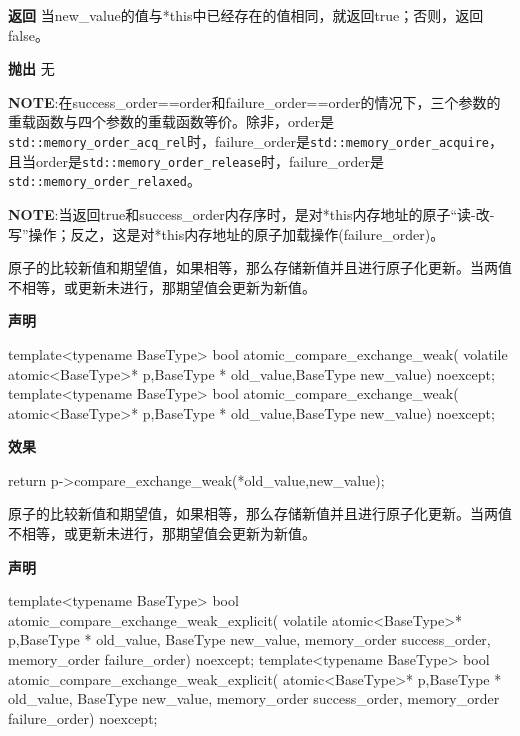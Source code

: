 \textbf{返回}
当new\_value的值与*this中已经存在的值相同，就返回true；否则，返回false。

\textbf{抛出}
无

\textbf{NOTE}:在success\_order==order和failure\_order==order的情况下，三个参数的重载函数与四个参数的重载函数等价。除非，order是\texttt{std::memory\_order\_acq\_rel}时，failure\_order是\texttt{std::memory\_order\_acquire}，且当order是\texttt{std::memory\_order\_release}时，failure\_order是\texttt{std::memory\_order\_relaxed}。

\textbf{NOTE}:当返回true和success\_order内存序时，是对*this内存地址的原子“读-改-写”操作；反之，这是对*this内存地址的原子加载操作(failure\_order)。


原子的比较新值和期望值，如果相等，那么存储新值并且进行原子化更新。当两值不相等，或更新未进行，那期望值会更新为新值。

\textbf{声明}

\begin{cpp}
template<typename BaseType>
bool atomic_compare_exchange_weak(
    volatile atomic<BaseType>* p,BaseType * old_value,BaseType new_value)
    noexcept;
template<typename BaseType>
bool atomic_compare_exchange_weak(
    atomic<BaseType>* p,BaseType * old_value,BaseType new_value) noexcept;
\end{cpp}

\textbf{效果}

\begin{cpp}
return p->compare_exchange_weak(*old_value,new_value);
\end{cpp}


原子的比较新值和期望值，如果相等，那么存储新值并且进行原子化更新。当两值不相等，或更新未进行，那期望值会更新为新值。

\textbf{声明}

\begin{cpp}
template<typename BaseType>
bool atomic_compare_exchange_weak_explicit(
    volatile atomic<BaseType>* p,BaseType * old_value,
    BaseType new_value, memory_order success_order,
    memory_order failure_order) noexcept;
template<typename BaseType>
bool atomic_compare_exchange_weak_explicit(
    atomic<BaseType>* p,BaseType * old_value,
    BaseType new_value, memory_order success_order,
    memory_order failure_order) noexcept;
\end{cpp}

